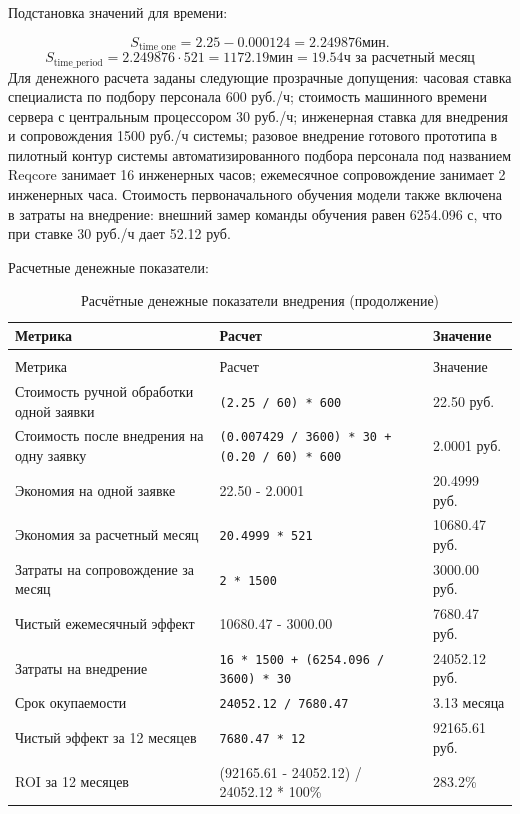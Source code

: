 Подстановка значений для времени:\par
\begin{equation}
\label{eq:s_time_one-31}
S_{\text{time\_one}} = 2.25 - 0.000124 = 2.249876 \text{мин.}
\end{equation}
\begin{equation}
\label{eq:s_time_period-32}
S_{\text{time\_period}} = 2.249876 \cdot 521 = 1172.19 \text{мин}= 19.54 \text{ч за расчетный месяц}
\end{equation}
Для денежного расчета заданы следующие прозрачные допущения: часовая ставка специалиста по подбору персонала 600 руб./ч; стоимость машинного времени сервера с центральным процессором 30 руб./ч; инженерная ставка для внедрения и сопровождения 1500 руб./ч системы; разовое внедрение готового прототипа в пилотный контур системы автоматизированного подбора персонала под названием Reqcore занимает 16 инженерных часов; ежемесячное сопровождение занимает 2 инженерных часа. Стоимость первоначального обучения модели также включена в затраты на внедрение: внешний замер команды обучения равен 6254.096 с, что при ставке 30 руб./ч дает 52.12 руб.\par
Расчетные денежные показатели:\par
{}
\begingroup
\setlength{\tabcolsep}{3pt}
\renewcommand{\arraystretch}{1}
{\linespread{1}\selectfont
\begin{longtable}{|P{0.30\textwidth}|P{0.34\textwidth}|P{0.28\textwidth}|}
\caption{Расчётные денежные показатели внедрения}\label{tbl:roi}\\*
\hline
Метрика & Расчет & Значение \\
\hline
\endfirsthead
\caption[]{Расчётные денежные показатели внедрения (продолжение)}\\*
\hline
Метрика & Расчет & Значение \\
\hline
\endhead
\hline
\endfoot
\hline
\endlastfoot
Стоимость ручной обработки одной заявки & \texttt{(2.25 / 60) * 600} & 22.50 руб. \\
\hline
Стоимость после внедрения на одну заявку & \texttt{(0.007429 / 3600) * 30 + (0.20 / 60) * 600} & 2.0001 руб. \\
\hline
Экономия на одной заявке & 22.50 - 2.0001 & 20.4999 руб. \\
\hline
Экономия за расчетный месяц & \texttt{20.4999 * 521} & 10680.47 руб. \\
\hline
Затраты на сопровождение за месяц & \texttt{2 * 1500} & 3000.00 руб. \\
\hline
Чистый ежемесячный эффект & 10680.47 - 3000.00 & 7680.47 руб. \\
\hline
Затраты на внедрение & \texttt{16 * 1500 + (6254.096 / 3600) * 30} & 24052.12 руб. \\
\hline
Срок окупаемости & \texttt{24052.12 / 7680.47} & 3.13 месяца \\
\hline
Чистый эффект за 12 месяцев & \texttt{7680.47 * 12} & 92165.61 руб. \\
\hline
ROI за 12 месяцев & (92165.61 - 24052.12) / 24052.12 * 100\% & 283.2\% \\
\end{longtable}
}
